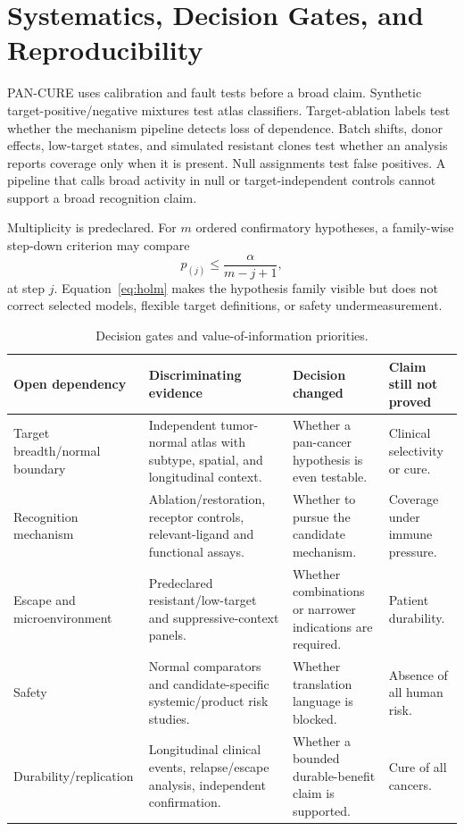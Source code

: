 \documentclass[10pt,conference]{IEEEtran}
\begin{document}
\section{Systematics, Decision Gates, and Reproducibility}\label{sec:systems}
PAN-CURE uses calibration and fault tests before a broad claim. Synthetic target-positive/negative mixtures test atlas classifiers. Target-ablation labels test whether the mechanism pipeline detects loss of dependence. Batch shifts, donor effects, low-target states, and simulated resistant clones test whether an analysis reports coverage only when it is present. Null assignments test false positives. A pipeline that calls broad activity in null or target-independent controls cannot support a broad recognition claim.

Multiplicity is predeclared. For $m$ ordered confirmatory hypotheses, a family-wise step-down criterion may compare
\begin{equation}p_{(j)}\leq\frac{\alpha}{m-j+1},\label{eq:holm}\end{equation}
at step $j$. Equation~\eqref{eq:holm} makes the hypothesis family visible but does not correct selected models, flexible target definitions, or safety undermeasurement.

\begin{table}[!t]\caption{Decision gates and value-of-information priorities.}\label{tab:gates}\centering\footnotesize
\begin{tabular}{@{}p{}p{}p{}p{}@{}}\toprule
Open dependency & Discriminating evidence & Decision changed & Claim still not proved\\\midrule
Target breadth/normal boundary & Independent tumor-normal atlas with subtype, spatial, and longitudinal context. & Whether a pan-cancer hypothesis is even testable. & Clinical selectivity or cure.\\
Recognition mechanism & Ablation/restoration, receptor controls, relevant-ligand and functional assays. & Whether to pursue the candidate mechanism. & Coverage under immune pressure.\\
Escape and microenvironment & Predeclared resistant/low-target and suppressive-context panels. & Whether combinations or narrower indications are required. & Patient durability.\\
Safety & Normal comparators and candidate-specific systemic/product risk studies. & Whether translation language is blocked. & Absence of all human risk.\\
Durability/replication & Longitudinal clinical events, relapse/escape analysis, independent confirmation. & Whether a bounded durable-benefit claim is supported. & Cure of all cancers.\\\bottomrule\end{tabular}\end{table}
\end{document}
